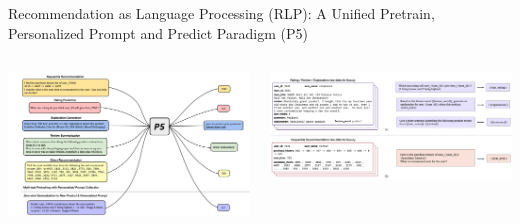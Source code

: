 \documentclass[11pt,aspectratio=169,handout]{beamer}
\begin{document}
\begin{frame}{Recommendation as Language Processing (RLP): A Unified Pretrain, Personalized Prompt and Predict Paradigm (P5) \cite{P5}}

\begin{columns}
\begin{column}{0.4\textwidth}
\begin{center}
\includegraphics[scale=0.15]{images/p5-tasks.png}
\end{center}
\end{column}

\begin{column}{0.5\textwidth}
\begin{center}
\includegraphics[scale=0.15]{images/p5-idea.png}
\end{center}
\end{column}
\end{columns}

\end{frame}
\end{document}
